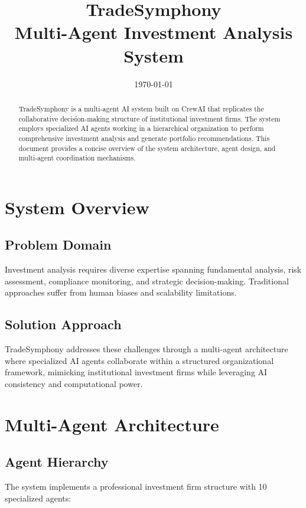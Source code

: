 \documentclass[11pt,a4paper]{article}
\title{\textbf{TradeSymphony} \\ 
       \large Multi-Agent Investment Analysis System}
\date{\today}
\begin{document}
\maketitle

\begin{abstract}
TradeSymphony is a multi-agent AI system built on CrewAI that replicates the collaborative decision-making structure of institutional investment firms. The system employs specialized AI agents working in a hierarchical organization to perform comprehensive investment analysis and generate portfolio recommendations. This document provides a concise overview of the system architecture, agent design, and multi-agent coordination mechanisms.
\end{abstract}

\section{System Overview}

\subsection{Problem Domain}
Investment analysis requires diverse expertise spanning fundamental analysis, risk assessment, compliance monitoring, and strategic decision-making. Traditional approaches suffer from human biases and scalability limitations.

\subsection{Solution Approach}
TradeSymphony addresses these challenges through a multi-agent architecture where specialized AI agents collaborate within a structured organizational framework, mimicking institutional investment firms while leveraging AI consistency and computational power.

\section{Multi-Agent Architecture}

\subsection{Agent Hierarchy}

The system implements a professional investment firm structure with 10 specialized agents:
\end{document}
